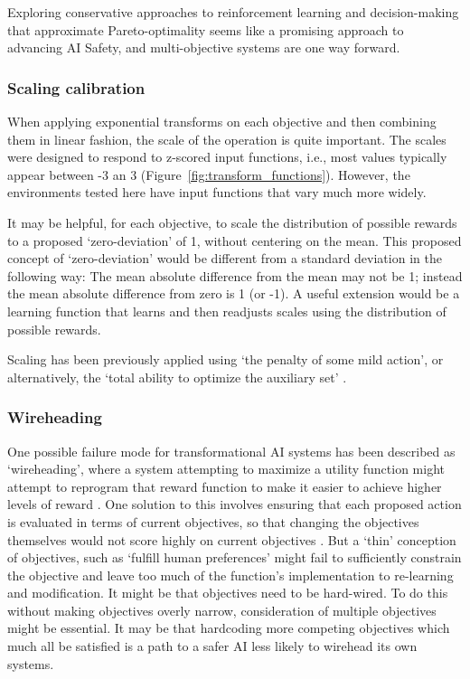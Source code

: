 Exploring conservative approaches to reinforcement learning and decision-making that approximate Pareto-optimality seems like a promising approach to advancing AI Safety, and multi-objective systems are one way forward.%

\subsubsection{Scaling calibration}

When applying exponential transforms on each objective and then combining them in linear fashion, the scale of the operation is quite important. The scales were designed to respond to z-scored input functions, i.e., most values typically appear between -3 an 3 (Figure~\ref{fig:transform_functions}). However, the environments tested here have input functions that vary much more widely.

It may be helpful, for each objective, to scale the distribution of possible rewards to a proposed `zero-deviation' of 1, without centering on the mean. This proposed concept of `zero-deviation' would be different from a standard deviation in the following way: The mean absolute difference from the mean may not be 1; instead the mean absolute difference from zero is 1 (or -1). A useful extension would be a learning function that learns and then readjusts scales using the distribution of possible rewards.

Scaling has been previously applied using `the penalty of some mild action', or alternatively, the `total ability to optimize the auxiliary set' %
\cite{turner_conservative_2020}.


\subsubsection{Wireheading}

One possible failure mode for  transformational AI systems has been described as `wireheading', where a system attempting to maximize a utility function might attempt to reprogram that reward function to make it easier to achieve higher levels of reward \cite{demski_a_stable_2017}. One solution to this involves ensuring that each proposed action is evaluated in terms of current objectives, so that changing the objectives themselves would not score highly on current objectives \cite{dewey_learning_2011}. But a `thin' conception of objectives, such as `fulfill human preferences' might fail to sufficiently constrain the objective and leave too much of the function's implementation to re-learning and modification. It might be that objectives need to be hard-wired. To do this without making objectives overly narrow, consideration of multiple objectives might be essential. It may be that hardcoding more competing objectives which much all be satisfied is a path to a safer AI less likely to wirehead its own systems.


